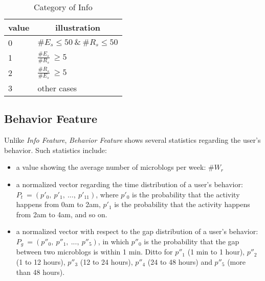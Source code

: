 

\begin{table}[!htb]
\centering
\begin{small}
\caption{Category of Info}
\vspace{0.3cm}
\label{tbl:ucate}
\begin{tabular}{ll}
\toprule
\multicolumn{1}{c}{\textbf{value}} & \multicolumn{1}{c}{\textbf{illustration}}	\\	\midrule \midrule
0                       & $\#E_s \le 50 \ \& \ \#R_s \le 50$				\\	\midrule
\multirow{2}{*}{1}      & \multirow{2}{*}{$\frac{\#E_s}{\#R_s} \ \ge 5$}	\\
 						&                       									\\	\midrule
\multirow{2}{*}{2}		& \multirow{2}{*}{$\frac{\#R_s}{\#E_s} \ \ge 5$}  \\
						&															\\	\midrule
3                   	& other cases 												\\ \bottomrule
\end{tabular}
\end{small}
\end{table}


\subsection{Behavior Feature}

Unlike \textit{Info Feature}, \textit{Behavior Feature} shows several statistics regarding the user's \retg{} behavior.
Such statistics include:
\begin{itemize}
	\item a value showing the average number of \retd{} microblogs per week: $\#W_r$
	\item a normalized vector regarding the time distribution of a user's \retg{} behavior: $P_t\ = (p'_0,\ p'_1,\ ...,\ p'_{11})$, where $p'_0$ is the probability that the \retg{} activity happens from 0am to 2am, $p'_1$ is the probability that the \retg{} activity happens from 2am to 4am, and so on.
	\item a normalized vector with respect to the gap distribution of a user's \retg{} behavior: $P_g\ = (p''_0,\ p''_1,\ ...,\ p''_{5})$, in which $p''_0$ is the probability that the gap between two \retd{} microblogs is within 1 min. Ditto for $p''_1$ (1 min to 1 hour), $p''_2$ (1 to 12 hours), $p''_3$ (12 to 24 hours), $p''_4$ (24 to 48 hours) and  $p''_5$ (more than 48 hours).
\end{itemize}


